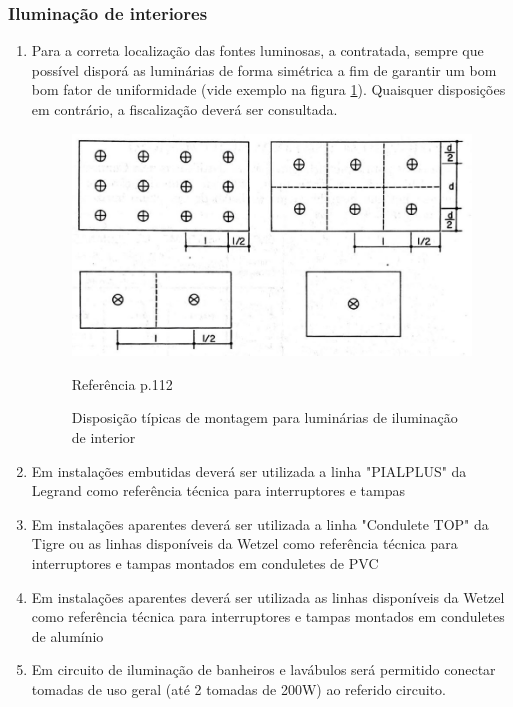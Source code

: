\subsubsection{Iluminação de interiores}\label {section: iluminacao_interiores}
	\begin{enumerate}
		\item Para a correta localização das fontes luminosas, a contratada, sempre que possível disporá as luminárias de forma simétrica a fim de garantir um bom bom fator de uniformidade (vide exemplo na figura \ref*{fig: disposicao}). Quaisquer disposições em contrário, a fiscalização deverá ser consultada.
		\begin{figure}[H]
			\centering
			\includegraphics[width=\textwidth]{Figures/3. Lighting/light-disposicao.jpg}
			\hfill
			\caption{Disposição típicas de montagem para luminárias de iluminação de interior}  Referência \cite{de1987iluminacao} p.112
			\label{fig: disposicao}
		\end{figure}
		
		\item Em instalações embutidas deverá ser utilizada a linha "PIALPLUS" da Legrand como referência técnica para interruptores e tampas
		
		\item Em instalações aparentes deverá ser utilizada a linha "Condulete TOP" da Tigre ou as linhas disponíveis da Wetzel como referência técnica para interruptores e tampas montados em conduletes de PVC
		
		\item Em instalações aparentes deverá ser utilizada as linhas disponíveis da Wetzel como referência técnica para interruptores e tampas montados em conduletes de alumínio
		
		\item\label{light:wc1}Em circuito de iluminação de banheiros e lavábulos será permitido conectar tomadas de uso geral (até 2 tomadas de 200W) ao referido circuito.
		

\end{enumerate}
